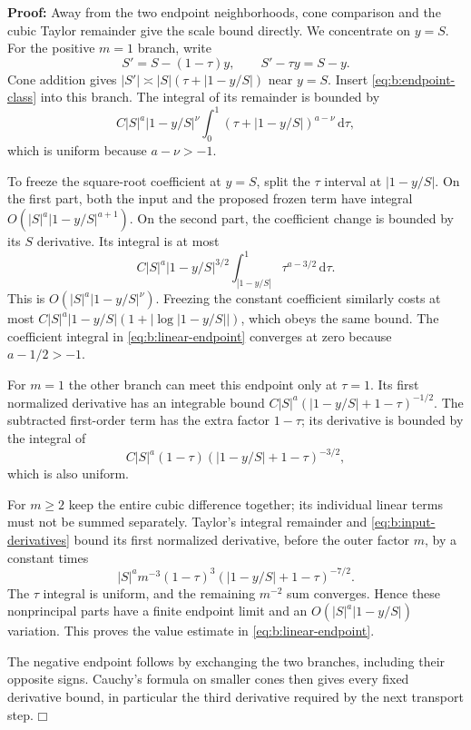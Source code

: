 \documentclass[a4paper,10pt]{article}
\numberwithin{equation}{section}
\newcommand{\dd}{\mathrm{d}}
\theoremstyle{paperplain}
\theoremstyle{paperremark}
\theoremstyle{paperplain}
\newenvironment{prf}{\noindent \textbf{Proof: }}{\hfill $\mdlgwhtsquare$\par\addvspace{0.5\baselineskip}}
\begin{document}
\begin{prf}
Away from the two endpoint neighborhoods, cone comparison and the
cubic Taylor remainder give the scale bound directly. We concentrate
on $y=S$.
For the positive $m=1$ branch, write
\[
 S'=S-(1-\tau)y,\qquad
 S'-\tau y=S-y.
\]
Cone addition gives
$|S'|\asymp |S|(\tau+|1-y/S|)$ near $y=S$.
Insert \eqref{eq:b:endpoint-class} into this branch. The integral
of its remainder is bounded by
\[
 C|S|^a|1-y/S|^\nu
       \int_0^1(\tau+|1-y/S|)^{a-\nu}\,\dd\tau,
\]
which is uniform because $a-\nu>-1$.

To freeze the square-root coefficient at $y=S$, split the
$\tau$ interval at $|1-y/S|$. On the first part, both the input
and the proposed frozen term have integral
$O(|S|^a|1-y/S|^{a+1})$. On the second part, the coefficient
change is bounded by its $S$ derivative. Its integral is at most
\[
 C|S|^a|1-y/S|^{3/2}
      \int_{|1-y/S|}^1\tau^{a-3/2}\,\dd\tau.
\]
This is $O(|S|^a|1-y/S|^\nu)$. Freezing the constant coefficient
similarly costs at most
$C|S|^a|1-y/S|(1+|\log|1-y/S||)$, which obeys the same bound.
The coefficient integral in \eqref{eq:b:linear-endpoint} converges
at zero because $a-1/2>-1$.

For $m=1$ the other branch can meet this endpoint only at
$\tau=1$. Its first normalized derivative has an integrable bound
$C|S|^a(|1-y/S|+1-\tau)^{-1/2}$.
The subtracted first-order term has the extra factor $1-\tau$;
its derivative is bounded by the integral of
\[
 C|S|^a(1-\tau)
                  (|1-y/S|+1-\tau)^{-3/2},
\]
which is also uniform.

For $m\geq2$ keep the entire cubic
difference together; its individual linear terms must not be
summed separately. Taylor's integral remainder and
\eqref{eq:b:input-derivatives} bound its first normalized derivative,
before the outer factor $m$, by a constant times
\[
 |S|^a m^{-3}(1-\tau)^3
                  (|1-y/S|+1-\tau)^{-7/2}.
\]
The $\tau$ integral is uniform, and the remaining $m^{-2}$ sum
converges. Hence these nonprincipal parts have a finite endpoint
limit and an $O(|S|^a|1-y/S|)$ variation. This proves the value
estimate in \eqref{eq:b:linear-endpoint}.

The negative endpoint
follows by exchanging the two branches, including their opposite
signs. Cauchy's formula on smaller cones then gives every fixed
derivative bound, in particular the third derivative required by
the next transport step.
\end{prf}
\end{document}
